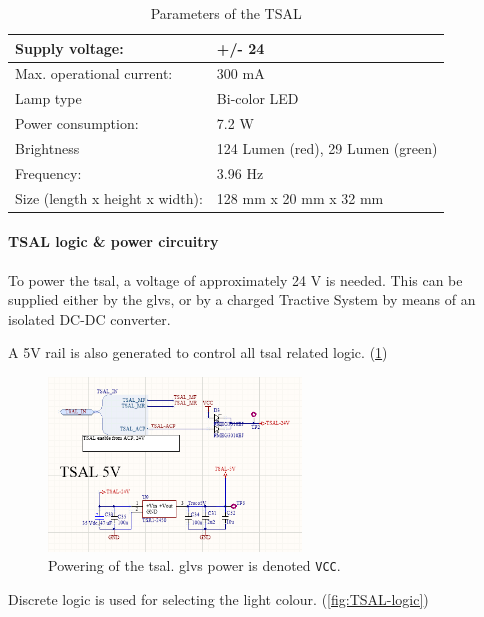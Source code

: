 \begin{table}[H]
	\centering
	\caption{Parameters of the TSAL}
	\begin{tabu}{|X|X|}
		\hline
		Supply voltage: & +/- 24 \vdc \\
		\hline
		Max. operational current: & 300 mA \\
		\hline
		Lamp type & Bi-color LED \\
		\hline
		Power consumption: & 7.2 W \\
		\hline
		Brightness & 124 Lumen (red), 29 Lumen (green) \\
		\hline
		Frequency: & 3.96 Hz \\
		\hline
		Size (length x height x width): & 128 mm x 20 mm x 32 mm \\
		\hline
	\end{tabu}%
	\label{tab:TSAL}%
\end{table}%

\paragraph{TSAL logic \& power circuitry}

To power the \gls{tsal}, a voltage of approximately 24 V is needed. This can be supplied either by the \gls{glvs}, or by a charged Tractive System by means of an isolated DC-DC converter.

A 5V rail is also generated to control all \gls{tsal} related logic. (\ref{fig:TSAL-ECUB-5V})

\begin{figure}[H]
	\centering
	\includegraphics[width=0.6\textwidth]{./img/TSAL-ECUB-5V.png}
	\caption[Powering of the TSAL]{Powering of the \gls{tsal}. \gls{glvs} power is denoted \texttt{VCC}.}
	\label{fig:TSAL-ECUB-5V}
\end{figure}

Discrete logic is used for selecting the light colour. (\ref{fig:TSAL-logic})

